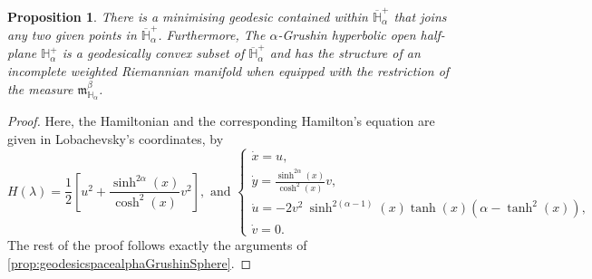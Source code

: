 \documentclass[11pt,twoside,a4paper]{article}
\newcommand{\red}{\color{red}}
\newcommand{\bbH}{\mathbb{H}}
\theoremstyle{theorem}
\newtheorem{prop}[theorem]{Proposition}
\theoremstyle{definition}
\theoremstyle{remark}
\theoremstyle{proof}
\begin{document}
\begin{prop}
    \label{prop:geodesicspacealphaGrushinHyperbolic}
     There is a
     minimising geodesic contained within $\overline{\bbH}^+_\alpha$ that joins any two given points in $\overline{\bbH}^+_\alpha$. Furthermore, The $\alpha$-Grushin hyperbolic open half-plane $\bbH_\alpha^+$ is a geodesically convex subset of $\overline{\bbH}_\alpha^+$ and has the structure of an incomplete weighted
     Riemannian manifold when equipped with the restriction of the measure $\mathfrak{m}^\beta_{\bbH_\alpha}$.
\end{prop}

\begin{proof}
Here, the Hamiltonian and the corresponding Hamilton's equation are given in Lobachevsky's coordinates, by
\begin{equation*}
    \label{eq:alphaGrushinHyperbolicHamilton}
    H(\lambda)=\frac{1}{2}\left[u^2+\frac{\sinh^{2\alpha}(x)}{\cosh^2(x)}v^2\right], \text{ and } \begin{cases}
    \dot{x}=u,\\
    \displaystyle \dot{y}=\frac{\sinh^{2\alpha}(x)}{\cosh^2(x)}v,\\
    \displaystyle \dot{u}= - 2 v^2 \ \sinh^{2(\alpha - 1)}(x) \tanh(x) (\alpha - \tanh^2(x)),\\
    \dot{v}=0.
\end{cases}
\end{equation*}
The rest of the proof follows exactly the arguments of \cref{prop:geodesicspacealphaGrushinSphere}.
\end{proof}


\end{document}

